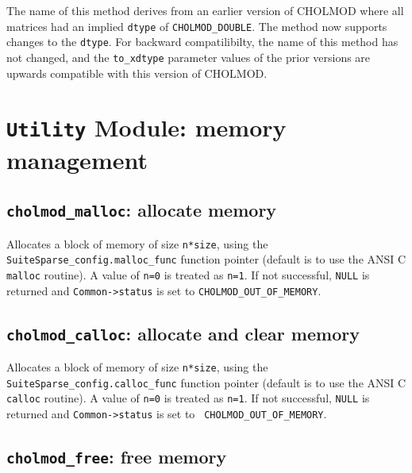 \documentclass[11pt]{article}
\begin{document}
The name of this method derives from an earlier version of CHOLMOD where all
matrices had an implied \verb'dtype' of \verb'CHOLMOD_DOUBLE'.  The method now
supports changes to the \verb'dtype'.  For backward compatilibilty, the name of
this method has not changed, and the \verb'to_xdtype' parameter values of the
prior versions are upwards compatible with this version of CHOLMOD.

\newpage \section{{\tt Utility} Module: memory management}

\subsection{{\tt cholmod\_malloc}: allocate memory}


Allocates a block of memory of size {\tt n*size}, using the {\tt
SuiteSparse\_config.malloc\_func} function pointer (default is to use the ANSI
C {\tt malloc} routine).  A value of {\tt n=0} is treated as {\tt n=1}.
If not successful, {\tt NULL} is returned and {\tt Common->status} is set to
{\tt CHOLMOD\_OUT\_OF\_MEMORY}.

\subsection{{\tt cholmod\_calloc}: allocate and clear memory}


Allocates a block of memory of size {\tt n*size}, using the {\tt
SuiteSparse\_config.calloc\_func} function pointer (default is to use the ANSI
C {\tt calloc} routine).  A value of {\tt n=0} is treated as {\tt n=1}.  If not
successful, {\tt NULL} is returned and {\tt Common->status} is set to {\tt
CHOLMOD\_OUT\_OF\_MEMORY}.

\subsection{{\tt cholmod\_free}: free memory}
\end{document}
